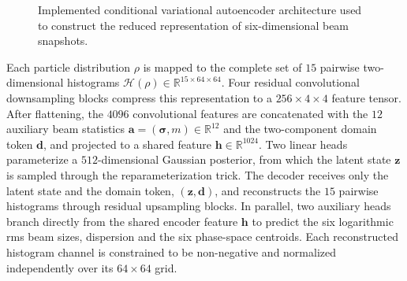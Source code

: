 \begin{figure}[h!]

\caption{
Implemented conditional variational autoencoder architecture used to
construct the reduced representation of six-dimensional beam snapshots.
}
\label{fig:cvae_architecture}

\end{figure}

Each particle distribution $\rho$ is mapped to the complete set of $15$ pairwise two-dimensional histograms $\mathcal{H}(\rho)\in\mathbb{R}^{15\times64\times64}$. Four residual convolutional downsampling blocks compress this representation to a $256\times4\times4$ feature tensor. After flattening, the $4096$ convolutional features are concatenated with the $12$ auxiliary beam statistics $\mathbf{a}= (\boldsymbol{\sigma},m)\in\mathbb{R}^{12}$ and the two-component domain token $\mathbf{d}$, and projected to a
shared feature $\mathbf{h}\in\mathbb{R}^{1024}$. Two linear heads parameterize a $512$-dimensional Gaussian posterior, from which the latent state $\mathbf{z}$ is sampled through the reparameterization trick. The decoder receives only the latent state and the domain token, $(\mathbf{z},\mathbf{d})$, and reconstructs the $15$ pairwise histograms through residual upsampling blocks. In parallel, two auxiliary heads branch directly from the shared encoder feature $\mathbf{h}$ to predict the six logarithmic rms beam sizes, dispersion and
the six phase-space centroids. Each reconstructed histogram channel is constrained to be non-negative and normalized independently over its $64\times64$ grid.

